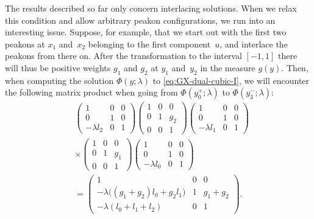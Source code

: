 \documentclass[10pt,a4paper]{article} \pdfoutput=1 
\begin{document}
The results described so far only concern interlacing solutions.
When we relax this condition and allow arbitrary peakon configurations,
we run into an interesting issue.
Suppose, for example, that we start out with the first two peakons at $x_{1}$ and~$x_{2}$
belonging to the first component~$u$, and interlace the peakons from there on.
After the transformation to the interval $[-1,1]$ there will thus be positive weights $g_1$ and $g_2$
at $y_1$ and~$y_2$ in the measure $g(y)$.
Then, when computing the solution $\Phi(y;\lambda)$ to \eqref{eq:GX-dual-cubic-I},
we will encounter the following matrix product when going from
$\Phi(y_0^+;\lambda)$ to $\Phi(y_{3}^-;\lambda)$:
\begin{equation*}
  \begin{split}
    &
    \begin{pmatrix} 1 & 0 & 0 \\ 0 & 1 & 0 \\ -\lambda l_{2} & 0 & 1 \end{pmatrix}
    \begin{pmatrix} 1 & 0 & 0 \\ 0 & 1 & g_{2} \\ 0 & 0 & 1 \end{pmatrix}
    \begin{pmatrix} 1 & 0 & 0 \\ 0 & 1 & 0 \\ -\lambda l_{1} & 0 & 1 \end{pmatrix}
    \\ &
    \times
    \begin{pmatrix} 1 & 0 & 0 \\ 0 & 1 & g_{1} \\ 0 & 0 & 1 \end{pmatrix}
    \begin{pmatrix} 1 & 0 & 0 \\ 0 & 1 & 0 \\ -\lambda l_{0} & 0 & 1 \end{pmatrix}
    \\ &
    =
    \begin{pmatrix} 1 & 0 & 0 \\ -\lambda \bigl( (g_{1} + g_{2}) l_{0} + g_{2} l_{1} \bigr) & 1 & g_{1} + g_{2} \\ -\lambda ( l_{0} + l_{1} + l_{2}) & 0 & 1 \end{pmatrix}
    .
  \end{split}
\end{equation*}
\end{document}
